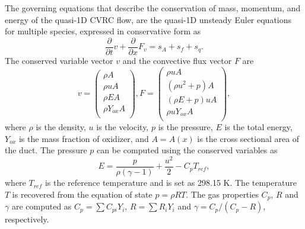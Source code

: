 The governing equations that describe the conservation of mass, momentum, and energy of the quasi-1D CVRC flow, are the quasi-1D unsteady Euler equations for multiple species, expressed in conservative form as
\begin{equation}\label{eq:5p2.1}
\frac{\partial }{\partial t} v + \frac{\partial }{\partial x} F_v = s_A + s_f + s_q.
\end{equation}
The conserved variable vector $v$ and the convective flux vector $F$ are
\begin{equation}\label{eq:5p2.2}
v= \left( \begin{gathered}
\rho A  \\
\rho uA  \\
\rho EA  \\
\rho Y_{ox} A \\
\end{gathered} \right), 
F = \left( \begin{gathered}
\rho uA  \\
\left(\rho u^2 + p\right)A  \\
\left(\rho E + p\right)uA  \\
\rho uY_{ox} A \\
\end{gathered} \right),
\end{equation}
where $\rho$ is the density, $u$ is the velocity, $p$ is the pressure, $E$ is the total energy, $Y_{ox}$ is the mass fraction of oxidizer, and $A=A(x)$ is the cross sectional area of the duct. The pressure $p$ can be computed using the conserved variables as
\begin{equation}\label{eq:total-engery}
E = \frac{p}{\rho (\gamma - 1)} + \frac{u^2}{2} - C_p T_{ref},
\end{equation}
where $T_{ref}$ is the reference temperature and is set as 298.15 K. The temperature $T$ is recovered from the equation of state $p = \rho R T$. The gas properties  $C_p$, $R$ and $\gamma$ are computed as $C_p= \sum C_{pi}Y_i$, $R=\sum R_iY_i$ and $ \gamma= C_p/(C_p-R)$, respectively. 

